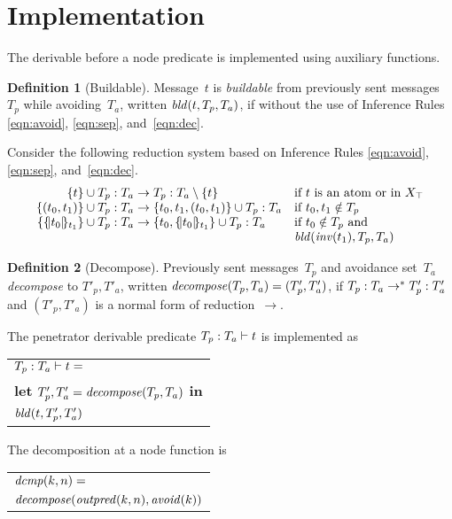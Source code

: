 \documentclass[12pt]{report}
\theoremstyle{definition}
\newtheorem{defn}{Definition}[chapter]
\newcommand{\outpred}{\fn{outpred}}
\newcommand{\avoid}{\fn{avoid}}
\begin{document}
\section{Implementation}\label{sec:derivable implementation}

The derivable before a node predicate is implemented using auxiliary
functions.

\begin{defn}[Buildable]
Message~$t$ is \emph{buildable} from previously sent
messages~$T_p$ while avoiding~$T_a$, written $\fn{bld}(t,T_p,T_a)$, if
 without the use of Inference Rules \ref{eqn:avoid},
\ref{eqn:sep}, and~\ref{eqn:dec}.
\end{defn}

Consider the following reduction system based on Inference Rules
\ref{eqn:avoid}, \ref{eqn:sep}, and~\ref{eqn:dec}.
$$\begin{array}{r@{}c@{}ll}
\dctx{\{t\}\cup T_p}{T_a}&{}\to{}&\dctx{T_p}{T_a}\setminus\{t\}
&\mbox{if $t$ is an atom or in $X_{\top}$}\\
\dctx{\{(t_0,t_1)\}\cup T_p}{T_a}&{}\to{}
&\dctx{\{t_0,t_1,(t_0,t_1)\}\cup T_p}{T_a}
&\mbox{if $t_0,t_1\notin T_p$}\\
\dctx{\{\enc{t_0}{t_1}\}\cup
T_p}{T_a}&{}\to{}&\dctx{\{t_0,\enc{t_0}{t_1}\}\cup T_p}{T_a}
&\mbox{if $t_0\notin T_p$ and}\\
&&&\fn{bld}(\fn{inv}(t_1),T_p,T_a)
\end{array}$$

\begin{defn}[Decompose]
Previously sent messages~$T_p$ and avoidance set~$T_a$
\emph{decompose} to $T'_p,T'_a$, written
$\fn{decompose}(T_p,T_a)=(T'_p,T'_a)$, if
$\dctx{T_p}{T_a}\to^\ast\dctx{T'_p}{T'_a}$
and $(T'_p,T'_a)$ is a normal form of reduction~$\to$.
\end{defn}

The penetrator derivable predicate $\der{t}{T_p}{T_a}$ is implemented as
\begin{center}
\begin{tabular}{l}
$\der{t}{T_p}{T_a}={}$\\
\quad\textbf{let} $T'_p, T'_a=\fn{decompose}(T_p,T_a)$ \textbf{in}\\
\quad$\fn{bld}(t,T'_p,T'_a)$
\end{tabular}
\end{center}

The decomposition at a node function is
\begin{center}
\begin{tabular}{l}
$\fn{dcmp}(k,n)={}$\\
\quad$\fn{decompose}(\outpred(k,n),\avoid(k))$
\end{tabular}
\end{center}
\end{document}
